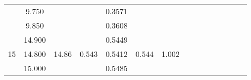 \documentclass[a4paper,12pt]{article}
\begin{document}
\begin{table}[htp]
\begin{tabular}{|c|c|c|c|c|c|c|c|c|c|c|c|c|c|c|}
                       & 9.750                   &                                       &                        & 0.3571 &                        &                        &                         &                             &                                                            &                                                               &                        &                        &                         &                               \\ \cline{2-2} \cline{5-5}
                       & 9.850                   &                                       &                        & 0.3608 &                        &                        &                         &                             &                                                            &                                                               &                        &                        &                         &                               \\ \cline{1-7}
\multirow{5}{*}{15}    & 14.900                  & \multirow{5}{*}{14.86}                & \multirow{5}{*}{0.543} & 0.5449 & \multirow{5}{*}{0.544} & \multirow{5}{*}{1.002} &                         &                             &                                                            &                                                               &                        &                        &                         &                               \\ \cline{2-2} \cline{5-5}
                       & 14.800                  &                                       &                        & 0.5412 &                        &                        &                         &                             &                                                            &                                                               &                        &                        &                         &                               \\ \cline{2-2} \cline{5-5}
                       & 15.000                  &                                       &                        & 0.5485 &                        &                        &                         &                             &                                                            &                                                               &                        &                        &                         &                               \\ \cline{2-2} \cline{5-5}

\end{tabular}
\end{table}
\end{document}
